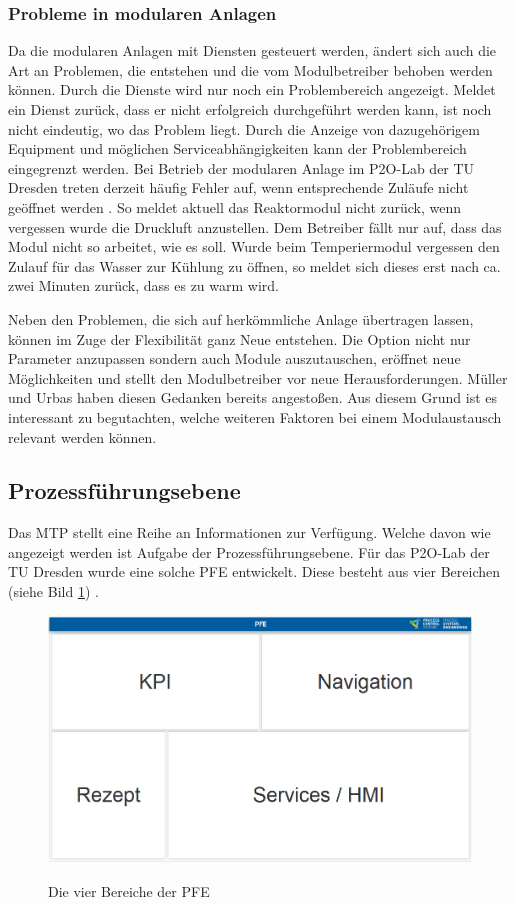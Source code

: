 \subsubsection*{Probleme in modularen Anlagen}
\label{Probleme-modulare-Anlage}
Da die modularen Anlagen mit Diensten gesteuert werden, ändert sich auch die Art an Problemen, die entstehen und die vom Modulbetreiber behoben werden können. Durch die Dienste wird nur noch ein Problembereich angezeigt. Meldet ein Dienst zurück, dass er nicht erfolgreich durchgeführt werden kann, ist noch nicht eindeutig, wo das Problem liegt. Durch die Anzeige von dazugehörigem Equipment und möglichen Serviceabhängigkeiten kann der Problembereich eingegrenzt werden. Bei Betrieb der modularen Anlage im P2O-Lab der TU Dresden treten derzeit häufig Fehler auf, wenn entsprechende Zuläufe nicht geöffnet werden . So meldet aktuell das Reaktormodul nicht zurück, wenn vergessen wurde die Druckluft anzustellen. Dem Betreiber fällt nur auf, dass das Modul nicht so arbeitet, wie es soll. Wurde beim Temperiermodul vergessen den Zulauf für das Wasser zur Kühlung zu öffnen, so meldet sich dieses erst nach ca. zwei Minuten zurück, dass es zu warm wird.

Neben den Problemen, die sich auf herkömmliche Anlage übertragen lassen, können im Zuge der Flexibilität ganz Neue entstehen. Die Option nicht nur Parameter anzupassen sondern auch Module auszutauschen, eröffnet neue Möglichkeiten und stellt den Modulbetreiber vor neue Herausforderungen. Müller und Urbas \cite{}  haben diesen Gedanken bereits angestoßen. Aus diesem Grund ist es interessant zu begutachten, welche weiteren Faktoren bei einem Modulaustausch relevant werden können.

\subsection{Prozessführungsebene}
\label{3:PFE}
Das MTP stellt eine Reihe an Informationen zur Verfügung. Welche davon wie angezeigt werden ist Aufgabe der Prozessführungsebene. Für das P2O-Lab der TU Dresden wurde eine solche PFE entwickelt. Diese besteht aus vier Bereichen (siehe Bild \ref{pic:Bereiche-PFE}) .
\begin{figure}[htbp]
\centering
\includegraphics[scale=0.25]{DA_files/Bilder/Analyse/PFE-Bereiche.png}
\label{pic:Bereiche-PFE}
\caption{Die vier Bereiche der PFE}
\end{figure}


